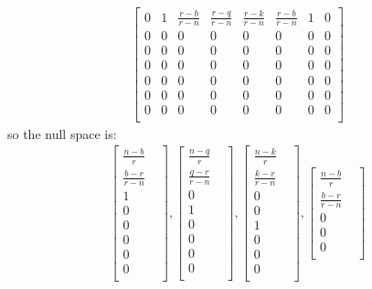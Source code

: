\documentclass[a4paper,11pt]{article}
\begin{document}
\begin{enumerate}
\begin{align*}
\begin{bmatrix}
0 & 1 & \frac{r-b}{r-n} & \frac{r-q}{r-n} & \frac{r-k}{r-n} & \frac{r-b}{r-n} & 1 & 0 \\
0 & 0 & 0 & 0 & 0 & 0 & 0 & 0 \\
0 & 0 & 0 & 0 & 0 & 0 & 0 & 0 \\
0 & 0 & 0 & 0 & 0 & 0 & 0 & 0 \\
0 & 0 & 0 & 0 & 0 & 0 & 0 & 0 \\
0 & 0 & 0 & 0 & 0 & 0 & 0 & 0 \\
0 & 0 & 0 & 0 & 0 & 0 & 0 & 0 \\
\end{bmatrix}
\end{align*}
so the null space is:
\begin{align*}
\begin{bmatrix}
\frac{n-b}{r} &  \\
\frac{b-r}{r-n} &  \\
1 & \\
0 & \\
0 & \\
0 & \\
0 & \\
0 & \\
\end{bmatrix},
\begin{bmatrix}
\frac{n-q}{r} &  \\
\frac{q-r}{r-n} &  \\
0 & \\
1 & \\
0 & \\
0 & \\
0 & \\
0 & \\
\end{bmatrix},
\begin{bmatrix}
\frac{n-k}{r} &  \\
\frac{k-r}{r-n} &  \\
0 & \\
0 & \\
1 & \\
0 & \\
0 & \\
0 & \\
\end{bmatrix},
\begin{bmatrix}
\frac{n-b}{r} &  \\
\frac{b-r}{r-n} &  \\
0 & \\
0 & \\
0 & \\

\end{bmatrix}
\end{align*}
\end{enumerate}
\end{document}
